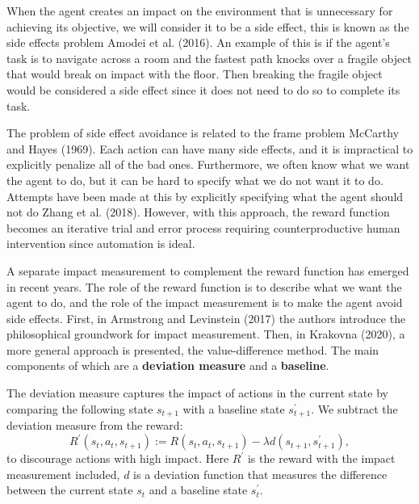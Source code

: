 \documentclass[12pt,A4]{report}
\theoremstyle{definition}
\begin{document}
When the agent creates an impact on the environment that is unnecessary for achieving its objective, we will consider it to be a side effect, this is known as the side effects problem Amodei et al. (2016). An example of this is if the agent's task is to navigate across a room and the fastest path knocks over a fragile object that would break on impact with the floor. Then breaking the fragile object would be considered a side effect since it does not need to do so to complete its task. 

The problem of side effect avoidance is related to the frame problem McCarthy and Hayes (1969). Each action can have many side effects, and it is impractical to explicitly penalize all of the bad ones. Furthermore, we often know what we want the agent to do, but it can be hard to specify what we do not want it to do. Attempts have been made at this by explicitly specifying what the agent should not do Zhang et al. (2018). However, with this approach, the reward function becomes an iterative trial and error process requiring counterproductive human intervention since automation is ideal. 

A separate impact measurement to complement the reward function has emerged in recent years. The role of the reward function is to describe what we want the agent to do, and the role of the impact measurement is to make the agent avoid side effects. First, in Armstrong and Levinstein (2017) the authors introduce the philosophical groundwork for impact measurement. Then, in Krakovna (2020), a more general approach is presented, the value-difference method. The main components of which are a \textbf{deviation measure} and a \textbf{baseline}. 

The deviation measure captures the impact of actions in the current state by comparing the following state $s_{t+1}$ with a baseline state $s_{t+1}^\prime$. We subtract the deviation measure from the reward: 
\[ R^\prime(s_t, a_t, s_{t+1}) := R(s_t, a_t, s_{t+1}) - \lambda d(s_{t+1
}, s_{t+1}^\prime), \]
to discourage actions with high impact. Here $R^\prime$ is the reward with the impact measurement included, $d$ is a deviation function that measures the difference between the current state $s_t$ and a baseline state $s_t^\prime$. 
\end{document}
